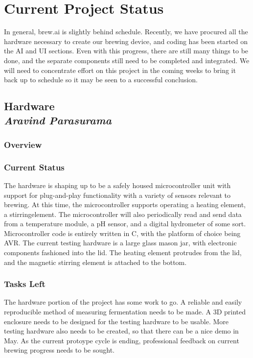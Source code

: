 \documentclass[draftclsnofoot,onecolumn,letterpaper,10pt]{IEEEtran}
\begin{document}
\section{Current Project Status}
In general, brew.ai is slightly behind schedule. Recently, we have procured all the hardware necessary to create our brewing device, and coding has been started on the AI and UI sections. Even with this progress, there are still many things to be done, and the separate components still need to be completed and integrated.
We will need to concentrate effort on this project in the coming weeks to bring it back up to schedule so it may be seen to a successful conclusion.

\subsection{Hardware\\{\em\textbf{Aravind Parasurama}}}
\subsubsection{Overview}

\subsubsection{Current Status}
The hardware is shaping up to be a safely housed microcontroller unit with support
for plug-and-play functionality with a variety of sensors relevant to brewing.
At this time, the microcontroller supports operating a heating element, a stirringelement.
The microcontroller will also periodically read and send data from a temperature
module, a pH sensor, and a digital hydrometer of some sort.
Microcontroller code is entirely written in C, with the platform of choice being
AVR.
The current testing hardware is a large glass mason jar, with electronic components
fashioned into the lid.
The heating element protrudes from the lid, and the magnetic stirring element
is attached to the bottom.

\subsubsection{Tasks Left}
The hardware portion of the project has some work to go.
A reliable and easily reproducible method of measuring fermentation needs to be made.
A 3D printed enclosure needs to be designed for the testing hardware to be usable.
More testing hardware also needs to be created, so that there can be a nice demo in May.
As the current protoype cycle is ending, professional feedback on current brewing progress
needs to be sought.
\end{document}
